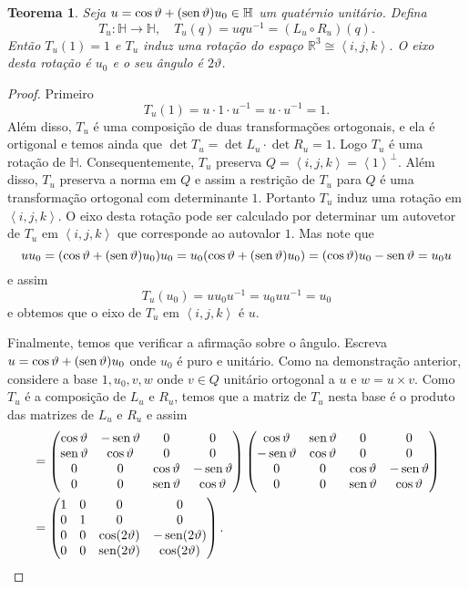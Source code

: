 \documentclass[12pt]{amsart}
\newcommand{\Ha}{\mathbb H}
\newcommand{\R}{\mathbb R}
\DeclareMathOperator{\sen}{\textrm{\rm sen}}
\newtheorem{theorem}{Teorema}
\theoremstyle{definition}
\begin{document}
\begin{theorem}
    Seja $u=\cos\vartheta+(\sen\vartheta)u_0\in\Ha$ um quatérnio unitário. Defina 
    \[
        T_u:\Ha\to \Ha,\quad T_u(q)=uqu^{-1}=(L_u\circ R_u)(q).
    \]
    Então $T_u(1)=1$ e $T_u$ induz uma rotação do espaço $\R^3\cong\left<i,j,k\right>$. O eixo desta rotação é 
    $u_0$ e o seu ângulo é $2\vartheta$.
\end{theorem}
\begin{proof}
    Primeiro
    \[
        T_u(1)=u\cdot 1\cdot u^{-1}=u\cdot u^{-1}=1.
    \]
    Além disso, $T_u$ é uma composição de duas transformações ortogonais, e ela é ortigonal e temos ainda que 
    $\det T_u=\det L_u\cdot\det R_u=1$. Logo $T_u$ é uma rotação de $\Ha$. 
    Consequentemente, $T_u$ preserva $Q=\left<i,j,k\right>=\left<1\right>^{\perp}$. 
    Além disso, $T_u$ preserva a norma em $Q$ e assim a restrição de $T_u$ para $Q$ 
    é uma transformação ortogonal com determinante $1$. Portanto $T_u$ induz uma rotação 
    em $\left<i,j,k\right>$.  O eixo desta rotação pode ser 
    calculado por determinar um autovetor de $T_u$ em $\left<i,j,k\right>$ 
    que corresponde ao autovalor $1$. Mas note que 
    \[
        uu_0=(\cos\vartheta+(\sen\vartheta)u_0)u_0=u_0(\cos\vartheta+(\sen\vartheta)u_0)=
        (\cos\vartheta) u_0-\sen\vartheta=u_0u
    \]
    e assim 
    \[
        T_u(u_0)=uu_0u^{-1}=u_0uu^{-1}=u_0
    \]
    e obtemos que o eixo de $T_u$ em $\left<i,j,k\right>$ é $u$.

    Finalmente, temos que verificar a afirmação sobre o ângulo. Escreva $u=\cos\vartheta+(\sen\vartheta)u_0$
    onde $u_0$ é puro e unitário. Como na demonstração anterior, considere a base $1,u_0,v,w$ onde 
    $v\in Q$ unitário ortogonal a $u$ e $w=u\times v$. Como $T_u$ é a composição de $L_u$ e $R_u$, temos 
    que a matriz de $T_u$ nesta base é o produto das matrizes de $L_u$ e $R_u$ e assim
    \begin{align*}
        [T_u]&=\begin{pmatrix} \cos\vartheta & -\sen\vartheta & 0 & 0 \\ \sen\vartheta & \cos\vartheta & 0 & 0 \\ 0 & 0 & \cos\vartheta & -\sen\vartheta \\ 0 & 0 & \sen\vartheta & \cos\vartheta\end{pmatrix}
        \begin{pmatrix} \cos\vartheta & \sen\vartheta & 0 & 0 \\ -\sen\vartheta & \cos\vartheta & 0 & 0 \\ 0 & 0 & \cos\vartheta & -\sen\vartheta \\ 0 & 0 & \sen\vartheta & \cos\vartheta\end{pmatrix}\\
        &=\begin{pmatrix} 1 & 0 & 0 & 0 \\ 0 & 1 & 0 & 0 \\ 0 & 0 & \cos(2\vartheta) & -\sen(2\vartheta) \\ 0 & 0 & \sen(2\vartheta) & \cos(2\vartheta)\end{pmatrix}.
    \end{align*}
\end{proof}
\end{document}
